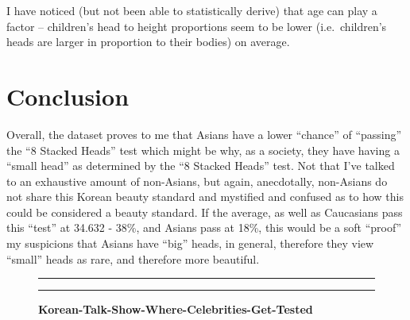 \documentclass[]{article}
\begin{document}
I have noticed (but not been able to statistically derive) that age can
play a factor -- children's head to height proportions seem to be lower
(i.e.~children's heads are larger in proportion to their bodies) on
average.

\section{Conclusion}
\label{sec:conclusion}

Overall, the dataset proves to me that Asians have a lower
\enquote{chance} of \enquote{passing} the \enquote{8 Stacked Heads} test
which might be why, as a society, they have having a \enquote{small
head} as determined by the \enquote{8 Stacked Heads} test. Not that I've
talked to an exhaustive amount of non-Asians, but again, anecdotally,
non-Asians do not share this Korean beauty standard and mystified and
confused as to how this could be considered a beauty standard. If the
average, as well as Caucasians pass this \enquote{test} at 34.632 -
38\%, and Asians pass at 18\%, this would be a soft \enquote{proof} my
suspicions that Asians have \enquote{big} heads, in general, therefore
they view \enquote{small} heads as rare, and therefore more beautiful.

\newpage

\begin{figure}[!ht]
    \hrule
    \caption{ \textbf{Korean-Talk-Show-Where-Celebrities-Get-Tested} }
    \begin{center}
    \end{center}
    \label{fig:Koreaboo-Image}
    \hrule
\end{figure}
\end{document}
